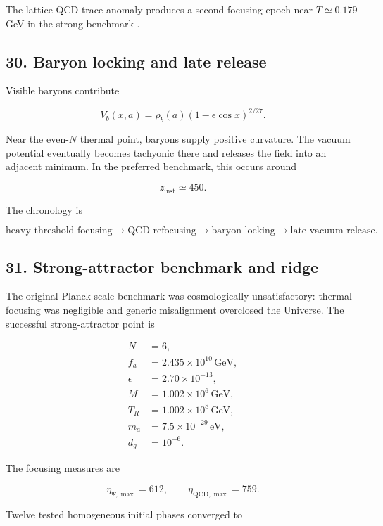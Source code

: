 \documentclass[
]{article}
\begin{document}
The lattice-QCD trace anomaly produces a second focusing epoch near
\(T\simeq0.179\) GeV in the strong benchmark
.

\subsection{30. Baryon locking and late
release}\label{baryon-locking-and-late-release}

Visible baryons contribute

\[
V_b(x,a)=\rho_b(a)(1-\epsilon\cos x)^{2/27}.
\]

Near the even-\(N\) thermal point, baryons supply positive curvature.
The vacuum potential eventually becomes tachyonic there and releases the
field into an adjacent minimum. In the preferred benchmark, this occurs
around

\[
z_{\mathrm{inst}}\simeq450.
\]

The chronology is

\[
\boxed{
\text{heavy-threshold focusing}
\rightarrow
\text{QCD refocusing}
\rightarrow
\text{baryon locking}
\rightarrow
\text{late vacuum release}.
}
\]

\subsection{31. Strong-attractor benchmark and
ridge}\label{strong-attractor-benchmark-and-ridge}

The original Planck-scale benchmark was cosmologically unsatisfactory:
thermal focusing was negligible and generic misalignment overclosed the
Universe. The successful strong-attractor point is

\[
\boxed{
\begin{aligned}
N&=6,\\
f_a&=2.435\times10^{10}\,\mathrm{GeV},\\
\epsilon&=2.70\times10^{-13},\\
M&=1.002\times10^6\,\mathrm{GeV},\\
T_R&=1.002\times10^8\,\mathrm{GeV},\\
m_a&=7.5\times10^{-29}\,\mathrm{eV},\\
d_g&=10^{-6}.
\end{aligned}}
\]

The focusing measures are

\[
\eta_{\Psi,\max}=612,
\qquad
\eta_{{\mathrm{QCD}},\max}=759.
\]

Twelve tested homogeneous initial phases converged to
\end{document}
